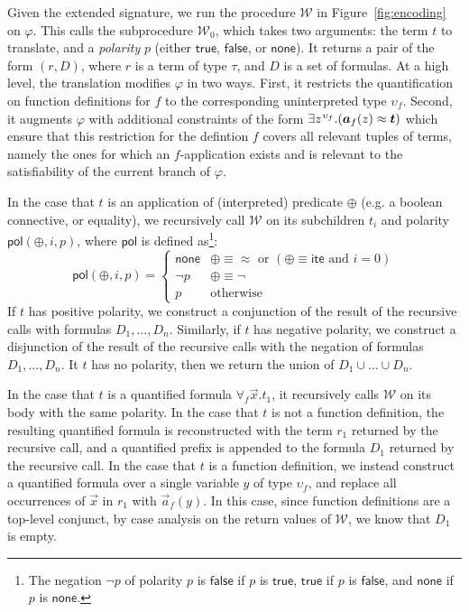 \documentclass[runningheads,a4paper]{llncs}
\newcommand{\con}[1]{\mathsf{#1}}
\newcommand{\teq}{\approx}
\newcommand{\conv}{\mathcal{W}}
\newcommand{\pnone}{\con{none}}
\newcommand{\ptrue}{\con{true}}
\newcommand{\pfalse}{\con{false}}
\newcommand{\pol}{\con{pol}}
\newcommand{\lite}{\con{ite}}
\newcommand{\boolop}{\oplus}
\newcommand{\forallf}[1]{\forall_{#1}}
\newcommand{\vecfarg}[1]{\vec{a}_{#1}}
\newcommand{\fargsort}[1]{\upsilon_{#1}}
\newcommand{\vthinspace}{\kern+0.083333em}
\newcommand{\typ}[1]{^{\vthinspace #1}}
\begin{document}
Given the extended signature, we run the procedure $\conv$ in Figure~\ref{fig:encoding} on $\varphi$.
This calls the subprocedure $\conv_0$, which takes two arguments: the term $t$ to translate, and a \emph{polarity} $p$ (either $\ptrue$, $\pfalse$, or $\pnone$).
It returns a pair of the form $( r, D )$, where $r$ is a term of type $\tau$, and $D$ is a set of formulas.
At a high level, the translation modifies $\varphi$ in two ways.
First, it restricts the quantification on function definitions for $f$ to the corresponding uninterpreted type $\fargsort{f}$.
Second, it augments $\varphi$ with additional constraints of the form $\exists z\typ{\fargsort{f}}. ( \vecfarg{f}( z ) \teq \vec t )$
which ensure that this restriction for the defintion $f$ covers all relevant tuples of terms,
namely the ones for which an $f$-application exists and is relevant to the satisfiability of the current branch of $\varphi$.

In the case that $t$ is an application of (interpreted) predicate $\boolop$ (e.g. a boolean connective, or equality),
we recursively call $\conv$ on its subchildren $t_i$ and polarity $\pol( \boolop, i, p )$, where $\pol$ is defined as\footnote{The negation $\neg p$ of polarity $p$ is 
$\pfalse$ if $p$ is $\ptrue$,
$\ptrue$ if $p$ is $\pfalse$, and
$\pnone$ if $p$ is $\pnone$.}:
\begin{equation*}
\pol( \boolop, i, p ) = \begin{cases}
                         \pnone & \boolop \equiv \teq \text{ or } ( \boolop \equiv \lite \text{ and } i=0 ) \\
                         \neg p & \boolop \equiv \neg \\
                         p & \text{otherwise}
                         \end{cases}
\end{equation*}
If $t$ has positive polarity,
we construct a conjunction of the result of the recursive calls with formulas $D_1, \ldots, D_n$.
Similarly, if $t$ has negative polarity,
we construct a disjunction of the result of the recursive calls with the negation of formulas $D_1, \ldots, D_n$.
It $t$ has no polarity,
then we return the union of $D_1 \cup \ldots \cup D_n$.

In the case that $t$ is a quantified formula $\forallf{f} \vec x. t_1$, it recursively calls $\conv$ on its body with the same polarity.
In the case that $t$ is not a function definition, 
the resulting quantified formula is reconstructed with the term $r_1$ returned by the recursive call,
and a quantified prefix is appended to the formula $D_1$ returned by the recursive call.
In the case that $t$ is a function definition,
we instead construct a quantified formula over a single variable $y$ of type $\fargsort{f}$,
and replace all occurrences of $\vec x$ in $r_1$ with $\vecfarg{f}( y )$.
In this case, since function definitions are a top-level conjunct, by case analysis on the return values of $\conv$, we know that $D_1$ is empty.
\end{document}
